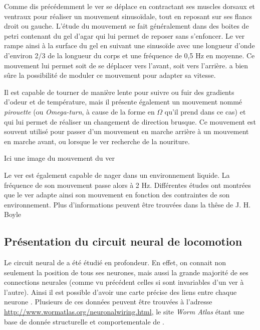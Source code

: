 Comme dis précédemment le ver se déplace en contractant ses muscles dorsaux et
ventraux pour réaliser un mouvement sinusoïdale, tout en reposant sur ses
flancs droit ou gauche. L'étude du mouvement se fait généralement dans des
boites de petri contenant du gel d'agar qui lui permet de reposer
sans s'enfoncer. Le ver rampe ainsi à la surface du gel en suivant une
sinusoïde avec une longueur d'onde d'environ 2/3 de la longueur du corps et 
une fréquence de 0,5 Hz en moyenne\cite{Boyle2009}. Ce mouvement lui permet
soit de se déplacer vers l'avant, soit vers l'arrière. \celeg{} a bien sûre
la possibilité de moduler ce mouvement pour adapter sa vitesse.

Il est capable de tourner de manière lente pour suivre ou fuir des gradients
d'odeur et de température, mais il présente également un mouvement nommé
\textit{pirouette} (ou \textit{Omega-turn}, à cause de la forme en $\Omega$ qu'il
prend dans ce cas) et qui lui permet de réaliser un changement de direction
brusque. Ce mouvement est souvent utilisé pour passer d'un mouvement en marche
arrière à un mouvement en marche avant, ou lorsque le ver recherche de la
nouriture.\\

\begin{center}
   Ici une image du mouvement du ver
\end{center}

Le ver est également capable de nager dans un environnement liquide. La fréquence
de son mouvement passe alors à 2 Hz. Différentes études ont montrées que le ver
adapte ainsi son mouvement en fonction des contraintes de son environnement.
Plus d'informations peuvent être trouvées dans la thêse de J. H. Boyle \cite{Boyle2009}


\subsection{Présentation du circuit neural de locomotion} %
\label{sub:Présentation du circuit neural de locomotion}

Le circuit neural de \celeg{} a été étudié en profondeur. En effet, on
connait non seulement la position de tous ses neurones, mais aussi la grande
majorité de ses connections neurales (comme vu précédent celles si sont
invariables d'un ver à l'autre).  Ainsi il est possible d'avoir une carte
précise des liens entre chaque neurone
\cite{Durbin1987,Chen2006,Boyle2009,Varshney2011}.  Plusieurs de ces données
peuvent être trouvées à l'adresse
\url{http://www.wormatlas.org/neuronalwiring.html}, le site \textit{Worm Atlas}
étant une base de donnée structurelle et comportementale de \celeg{}.

